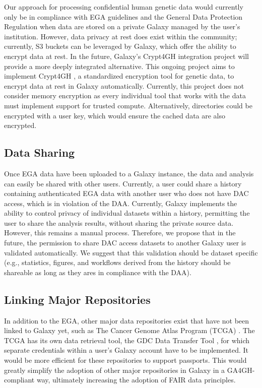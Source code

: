 Our approach for processing confidential human genetic data would currently only be in compliance with EGA guidelines and the General Data Protection Regulation \cite{GDPR} when data are stored on a private Galaxy managed by the user's institution. However, data privacy at rest does exist within the community; currently, S3 buckets \cite{S3_buckets} can be leveraged by Galaxy, which offer the ability to encrypt data at rest. In the future, Galaxy's Crypt4GH \cite{galaxy_crypt4gh} integration project will provide a more deeply integrated alternative. This ongoing project aims to implement Crypt4GH \cite{crypt4gh}, a standardized encryption tool for genetic data, to encrypt data at rest in Galaxy automatically. Currently, this project does not consider memory encryption as every individual tool that works with the data must implement support for trusted compute. Alternatively, directories could be encrypted with a user key, which would ensure the cached data are also encrypted.

\subsection*{Data Sharing}
Once EGA data have been uploaded to a Galaxy instance, the data and analysis can easily be shared with other users. Currently, a user could share a history containing authenticated EGA data with another user who does not have DAC access, which is in violation of the DAA. Currently, Galaxy implements the ability to control privacy of individual datasets within a history, permitting the user to share the analysis results, without sharing the private source data. However, this remains a manual process. Therefore, we propose that in the future, the permission to share DAC access datasets to another Galaxy user is validated automatically. We suggest that this validation should be dataset specific (e.g., statistics, figures, and workflows derived from the history should be shareable as long as they ares in compliance with the DAA).

\subsection*{Linking Major Repositories}
In addition to the EGA, other major data repositories exist that have not been linked to Galaxy yet, such as The Cancer Genome Atlas Program (TCGA) \cite{TCGA}. The TCGA has its own data retrieval tool, the GDC Data Transfer Tool \cite{GDC}, for which separate credentials within a user's Galaxy account have to be implemented. It would be more efficient for these repositories to support passports. This would greatly simplify the adoption of other major repositories in Galaxy in a GA4GH-compliant way, ultimately increasing the adoption of FAIR data principles.

